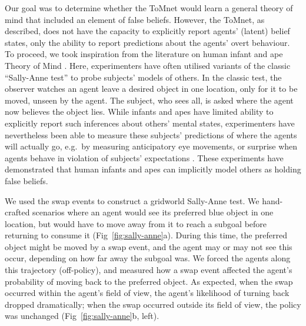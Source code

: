 \documentclass{article}
\begin{document}
Our goal was to determine whether the ToMnet would learn a general theory of mind that included an element of false beliefs. However, the ToMnet, as described, does not have the capacity to explicitly report agents' (latent) belief states, only the ability to report predictions about the agents' overt behaviour. To proceed, we took inspiration from the literature on human infant and ape Theory of Mind \cite{call2008does, baillargeon2016psychological}. Here, experimenters have often utilised variants of the classic ``Sally-Anne test'' \cite{wimmer1983beliefs, baron1985does} to probe subjects' models of others. In the classic test, the observer watches an agent leave a desired object in one location, only for it to be moved, unseen by the agent. The subject, who sees all, is asked where the agent now believes the object lies. While infants and apes have limited ability to explicitly report such inferences about others' mental states, experimenters have nevertheless been able to measure these subjects' predictions of where the agents will actually go, e.g.\ by measuring anticipatory eye movements, or surprise when agents behave in violation of subjects' expectations \cite{call2008does, krupenye2016great, baillargeon2016psychological}. These experiments have demonstrated that human infants and apes can implicitly model others as holding false beliefs.

We used the swap events to construct a gridworld Sally-Anne test. We hand-crafted scenarios where an agent would see its preferred blue object in one location, but would have to move away from it to reach a subgoal before returning to consume it (Fig~\ref{fig:sally-anne}a). During this time, the preferred object might be moved by a swap event, and the agent may or may not see this occur, depending on how far away the subgoal was. We forced the agents along this trajectory (off-policy), and measured how a swap event affected the agent's probability of moving back to the preferred object. As expected, when the swap occurred within the agent's field of view, the agent's likelihood of turning back dropped dramatically; when the swap occurred outside its field of view, the policy was unchanged (Fig~\ref{fig:sally-anne}b, left).
\end{document}
